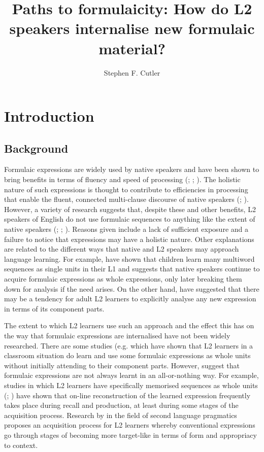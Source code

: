 \documentclass[output=paper]{langscibook}
\author{Stephen F. Cutler\affiliation{Cardiff University}}
\title[Paths to formulaicity: How do L2 speakers internalise formulaic material?]{Paths to formulaicity: How do L2 speakers internalise new formulaic material?}
\begin{document}
\maketitle 

\section{Introduction} 
\subsection{Background}

Formulaic expressions are widely used by native speakers and have been shown to bring benefits in terms of fluency and speed of processing (\citealt{Siyanova-ChanturiaSidtis2019}; \citealt{TowellEtAl1996}; \citealt{Wray2002}). The holistic nature of such expressions is thought to contribute to efficiencies in processing that enable the fluent, connected multi-clause discourse of native speakers (\citealt{PawleySyder1983}; \citealt{TremblayBaayen2010}). However, a variety of research suggests that, despite these and other benefits, L2 speakers of English do not use formulaic sequences to anything like the extent of native speakers (\citealt{Granger2019}; \citealt{Meunier2012}; \citealt{PaquotGranger2012}). Reasons given include a lack of sufficient exposure and a failure to notice that expressions may have a holistic nature. Other explanations \citep{Wray2019} are related to the different ways that native and L2 speakers may approach language learning. For example, \citet{DąbrowskaLieven2005} have shown that children learn many multiword sequences as single units in their L1 and \citet{Wray2002} suggests that native speakers continue to acquire formulaic expressions as whole expressions, only later breaking them down for analysis if the need arises. On the other hand, \citet{WrayPerkins2000} have suggested that there may be a tendency for adult L2 learners to explicitly analyse any new expression in terms of its component parts. 

The extent to which L2 learners use such an approach and the effect this has on the way that formulaic expressions are internalised have not been widely researched. There are some studies (e.g. \citealt{MylesEtAl1998} which have shown that L2 learners in a classroom situation do learn and use some formulaic expressions as whole units without initially attending to their component parts. However, \citet{SchmittCarter2004} suggest that formulaic expressions are not always learnt in an all-or-nothing way. For example, studies in which L2 learners have specifically memorised sequences as whole units (\citealt{BoersLindstromberg2012}; \citealt{WrayFitzpatrick2008}) have shown that on-line reconstruction of the learned expression frequently takes place during recall and production, at least during some stages of the acquisition process. Research by \citet{Bardovi-Harlig2019} in the field of second language pragmatics proposes an acquisition process for L2 learners whereby conventional expressions go through stages of becoming more target-like in terms of form and appropriacy to context.
\end{document}
